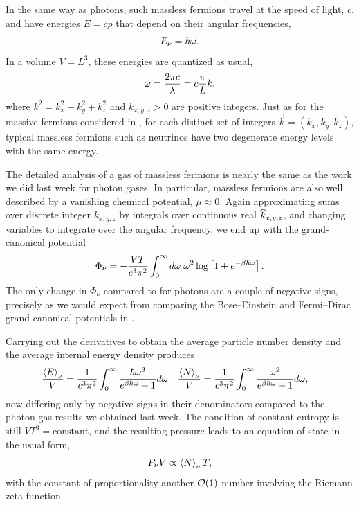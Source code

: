 In the same way as photons, such massless fermions travel at the speed of light, $c$, and have energies $E = cp$ that depend on their angular frequencies,
\begin{equation}
  E_{\nu} = \hbar \omega.
\end{equation}
In a volume $V = L^3$, these energies are quantized as usual,
\begin{equation*}
  \omega = \frac{2\pi c}{\lambda} = c \frac{\pi}{L} k,
\end{equation*}
where $k^2 = k_x^2 + k_y^2 + k_z^2$ and $k_{x, y, z} > 0$ are positive integers.
Just as for the massive fermions considered in , for each distinct set of integers $\vec k = (k_x, k_y, k_z)$, typical massless fermions such as neutrinos have two degenerate energy levels with the same energy.

The detailed analysis of a gas of massless fermions is nearly the same as the work we did last week for photon gases.
In particular, massless fermions are also well described by a vanishing chemical potential, $\mu \approx 0$.
Again approximating sums over discrete integer $k_{x, y, z}$ by integrals over continuous real $\widehat k_{x, y, z}$, and changing variables to integrate over the angular frequency, we end up with the grand-canonical potential
\begin{align}
  \Phi_{\nu} = -\frac{VT}{c^3 \pi^2} \int_0^{\infty} d\omega \; \omega^2 \log\left[1 + e^{-\beta \hbar \omega}\right]. \label{eq:neutrino_grand}
\end{align}
The only change in $\Phi_{\nu}$ compared to  for photons are a couple of negative signs, precisely as we would expect from comparing the Bose--Einstein and Fermi--Dirac grand-canonical potentials in .

Carrying out the derivatives to obtain the average particle number density and the average internal energy density produces
\begin{align}
  \frac{\left\langle E \right\rangle_{\nu}}{V} & = \frac{1}{c^3 \pi^2} \int_0^{\infty} \frac{\hbar \omega^3}{e^{\beta \hbar \omega} + 1} d\omega &
  \frac{\left\langle N \right\rangle_{\nu}}{V} & = \frac{1}{c^3 \pi^2} \int_0^{\infty} \frac{\omega^2}{e^{\beta \hbar \omega} + 1} d\omega,
\end{align}
now differing only by negative signs in their denominators compared to the photon gas results we obtained last week.
The condition of constant entropy is still $V T^3 = \mbox{constant}$, and the resulting pressure leads to an equation of state in the usual form,
\begin{equation*}
  P_{\nu} V \propto \left\langle N \right\rangle_{\nu} T,
\end{equation*}
with the constant of proportionality another $\mathcal O(1)$ number involving the Riemann zeta function.
